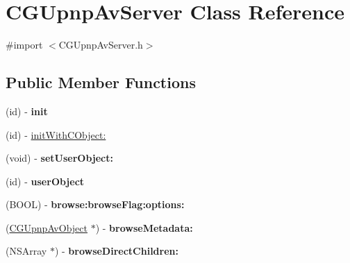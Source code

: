 \hypertarget{interface_c_g_upnp_av_server}{\section{C\-G\-Upnp\-Av\-Server Class Reference}
\label{interface_c_g_upnp_av_server}
}


{\ttfamily \#import $<$C\-G\-Upnp\-Av\-Server.\-h$>$}

\subsection*{Public Member Functions}
\begin{DoxyCompactItemize}
\item 
\hypertarget{interface_c_g_upnp_av_server_ae6fa9f627c5cf076ac20685ecfb787ba}{(id) -\/ {\bfseries init}}\label{interface_c_g_upnp_av_server_ae6fa9f627c5cf076ac20685ecfb787ba}

\item 
(id) -\/ \hyperlink{interface_c_g_upnp_av_server_af2e6aa0f5299f93d9783904740e564e5}{init\-With\-C\-Object\-:}
\item 
\hypertarget{interface_c_g_upnp_av_server_a552283ad9665324c1c47b25efbbda946}{(void) -\/ {\bfseries set\-User\-Object\-:}}\label{interface_c_g_upnp_av_server_a552283ad9665324c1c47b25efbbda946}

\item 
\hypertarget{interface_c_g_upnp_av_server_a043bfcc8c20cb011c97b68ad805183ff}{(id) -\/ {\bfseries user\-Object}}\label{interface_c_g_upnp_av_server_a043bfcc8c20cb011c97b68ad805183ff}

\item 
\hypertarget{interface_c_g_upnp_av_server_a54d80acc86d35c1cd250f2ee4e10a475}{(B\-O\-O\-L) -\/ {\bfseries browse\-:browse\-Flag\-:options\-:}}\label{interface_c_g_upnp_av_server_a54d80acc86d35c1cd250f2ee4e10a475}

\item 
\hypertarget{interface_c_g_upnp_av_server_a579f61685219e9a1cdf99b0084f1fc14}{(\hyperlink{interface_c_g_upnp_av_object}{C\-G\-Upnp\-Av\-Object} $\ast$) -\/ {\bfseries browse\-Metadata\-:}}\label{interface_c_g_upnp_av_server_a579f61685219e9a1cdf99b0084f1fc14}

\item 
\hypertarget{interface_c_g_upnp_av_server_aca2ac5dc92589e1b28af0c360a196e61}{(N\-S\-Array $\ast$) -\/ {\bfseries browse\-Direct\-Children\-:}}\label{interface_c_g_upnp_av_server_aca2ac5dc92589e1b28af0c360a196e61}


\end{DoxyCompactItemize}
